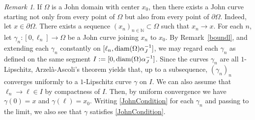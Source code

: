 \documentclass[12pt]{article}
\theoremstyle{definition}
\theoremstyle{remark}
\newtheorem{remark}[theorem]{Remark}
\numberwithin{equation}{section}
\DeclareMathOperator{\dist}{dist}
\newcommand{\dd}{\partial}
\newcommand{\N}{\mathbb{N}}
\begin{document}

\begin{remark}\label{boundaryJ}
    If $\Omega$ is a John domain with center $x_0$, then there exists a John curve starting not only from every point
    of $\Omega$ but also from every point of $\dd\Omega$. Indeed, let $x\in\dd\Omega$. There exists a sequence
    $(x_n)_{n\in\N}\subset\Omega$ such that $x_n \to x$. For each $n$, let $\gamma_n : [0,\ell_n] \longrightarrow
    \Omega$ be a John curve joining $x_n$ to $x_0$. By Remark~\ref{boundl}, and extending each $\gamma_n$ constantly
    on $[\ell_n,{\rm diam}(\Omega)\alpha_J^{-1}]$, we may regard each $\gamma_n$ as defined on the same segment
    $I:=[0,{\rm diam}(\Omega)\alpha_J^{-1}]$. Since the curves $\gamma_n$ are all $1$-Lipschitz, Arzel\`a-Ascoli's
    theorem yields that, up to a subsequence, $(\gamma_n)_n$ converges uniformly to a $1$-Lipschitz curve $\gamma$ on $I$.
    We can also assume that $\ell_n\to \ell \in I$ by compactness of $I$. Then, by uniform convergence we have
    $\gamma(0)=x$ and $\gamma(\ell)=x_0$. Writing \eqref{JohnCondition} for each $\gamma_n$ and passing to the limit,
    we also see that $\gamma$ satisfies \eqref{JohnCondition}.
\end{remark}
\end{document}
